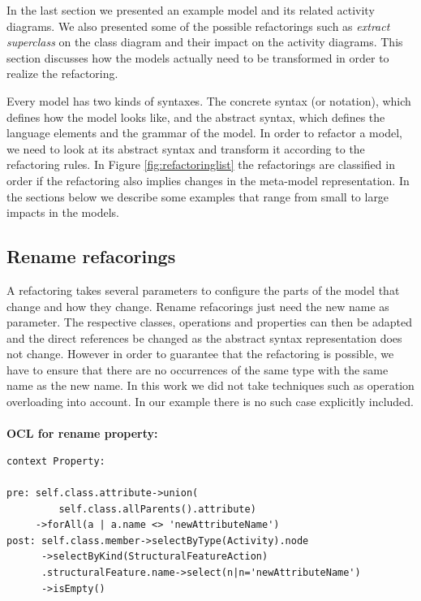 \documentclass{llncs}
\begin{document}
In the last section we presented an example model and its related activity diagrams. We also presented some of the possible 
refactorings such as \textit{extract superclass} on the class diagram and their impact on the activity diagrams. This 
section discusses how the models actually need to be transformed in order to realize the refactoring.

Every model has two kinds of syntaxes. The concrete syntax (or notation), which defines how the model looks like, and the abstract
syntax, which defines the language elements and the grammar of the model. In order to refactor a model, we need to look 
at its abstract syntax and transform it according to the refactoring rules. In Figure \ref{fig:refactoringlist} the 
refactorings are classified in order if the refactoring also implies changes in the meta-model representation. In the 
sections below we describe some examples that range from small to large impacts in the models.

\subsection{Rename refacorings}
\label{sec:renames}
A refactoring takes several parameters to configure the parts of the model that change and how they change. Rename 
refacorings just need the new name as parameter. The respective classes, operations and properties can then be adapted 
and the direct references be changed as the abstract syntax representation does not change. However in order to guarantee that the 
refactoring is possible, we have to ensure that there are no occurrences of the same type with the same name as the 
new name. In this work we did not take techniques such as operation overloading into account. In our example there is 
no such case explicitly included.
\\ \\
\textbf{OCL for rename property:}
\begin{lstlisting}
context Property:

pre: self.class.attribute->union(
         self.class.allParents().attribute)
     ->forAll(a | a.name <> 'newAttributeName')
post: self.class.member->selectByType(Activity).node
      ->selectByKind(StructuralFeatureAction)
      .structuralFeature.name->select(n|n='newAttributeName')
      ->isEmpty()
\end{lstlisting}
\end{document}
